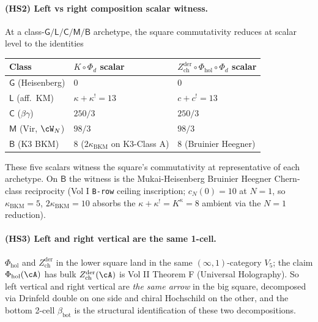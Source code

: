\paragraph*{(HS2) Left vs right composition scalar witness.}
At a class-$\mathsf{G}/\mathsf{L}/\mathsf{C}/\mathsf{M}/\mathsf{B}$
archetype, the square commutativity reduces at scalar level to the
identities

\begin{center}
\begin{tabular}{l|l|l}
 Class & $K\circ\Phi_d$ scalar & $Z^{\mathrm{der}}_{\mathrm{ch}}\circ\Phi_{\mathrm{hol}}\circ\Phi_d$ scalar \\
 \hline
 $\mathsf{G}$ (Heisenberg) & $0$ & $0$ \\
 $\mathsf{L}$ (aff.\ KM) & $\kappa+\kappa^!=13$ & $c+c^!=13$ \\
 $\mathsf{C}$ ($\beta\gamma$) & $250/3$ & $250/3$ \\
 $\mathsf{M}$ (Vir, $\cW_N$) & $98/3$ & $98/3$ \\
 $\mathsf{B}$ (K3 BKM) & $8$ ($2\kappa_{\mathrm{BKM}}$ on K3-Class A) &
 $8$ (Bruinier Heegner)
\end{tabular}
\end{center}
These five scalars witness the square's commutativity at
representative of each archetype. On $\mathsf{B}$ the witness is the
Mukai-Heisenberg Bruinier Heegner Chern-class reciprocity (Vol I
\texttt{B-row} ceiling inscription; $c_N(0)=10$ at $N=1$, so
$\kappa_{\mathrm{BKM}}=5$, $2\kappa_{\mathrm{BKM}}=10$ absorbs the
$\kappa+\kappa^!=K^\kappa=8$ ambient via the $N=1$ reduction).

\paragraph*{(HS3) Left and right vertical are the same 1-cell.}
$\Phi_{\mathrm{hol}}$ and $Z^{\mathrm{der}}_{\mathrm{ch}}$ in the
lower square land in the same $(\infty,1)$-category $V_5$; the claim
$\Phi_{\mathrm{hol}}(\cA)$ has bulk $Z^{\mathrm{der}}_{\mathrm{ch}}(\cA)$
is Vol II Theorem F (Universal Holography). So left vertical and
right vertical are \emph{the same arrow} in the big square,
decomposed via Drinfeld double on one side and chiral Hochschild on
the other, and the bottom 2-cell $\beta_{\mathrm{bot}}$ is the
structural identification of these two decompositions.

